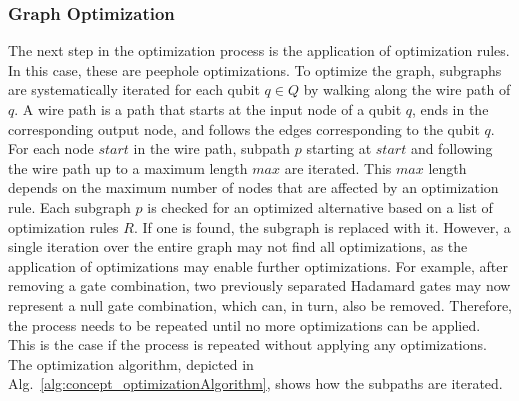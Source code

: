\subsubsection{Graph Optimization}
The next step in the optimization process is the application of optimization rules. In this case, these are peephole optimizations. To optimize the graph, subgraphs are systematically iterated for each qubit $q \in Q$ by walking along the wire path of $q$.
A wire path is a path that starts at the input node of a qubit $q$, ends in the corresponding output node, and follows the edges corresponding to the qubit $q$. 
For each node $start$ in the wire path, subpath $p$ starting at $start$ and following the wire path up to a maximum length $max$ are iterated.
This $max$ length depends on the maximum number of nodes that are affected by an optimization rule.
Each subgraph $p$ is checked for an optimized alternative based on a list of optimization rules $R$. If one is found, the subgraph is replaced with it. 
However, a single iteration over the entire graph may not find all optimizations, as the application of optimizations may enable further optimizations. 
For example, after removing a gate combination, two previously separated Hadamard gates may now represent a null gate combination, which can, in turn, also be removed.
Therefore, the process needs to be repeated until no more optimizations can be applied. This is the case if the process is repeated without applying any optimizations.
The optimization algorithm, depicted in Alg.~\ref{alg:concept_optimizationAlgorithm}, shows how the subpaths are iterated.

